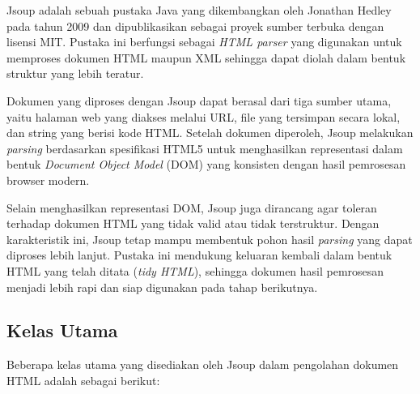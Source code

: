 

Jsoup adalah sebuah pustaka Java yang dikembangkan oleh Jonathan Hedley pada tahun 2009 dan dipublikasikan sebagai proyek sumber terbuka dengan lisensi MIT. Pustaka ini berfungsi sebagai \textit{HTML parser} yang digunakan untuk memproses dokumen HTML maupun XML sehingga dapat diolah dalam bentuk struktur yang lebih teratur.  

Dokumen yang diproses dengan Jsoup dapat berasal dari tiga sumber utama, yaitu halaman web yang diakses melalui URL, file yang tersimpan secara lokal, dan string yang berisi kode HTML. Setelah dokumen diperoleh, Jsoup melakukan \textit{parsing} berdasarkan spesifikasi HTML5 untuk menghasilkan representasi dalam bentuk \textit{Document Object Model} (DOM) yang konsisten dengan hasil pemrosesan browser modern.  

Selain menghasilkan representasi DOM, Jsoup juga dirancang agar toleran terhadap dokumen HTML yang tidak valid atau tidak terstruktur. Dengan karakteristik ini, Jsoup tetap mampu membentuk pohon hasil \textit{parsing} yang dapat diproses lebih lanjut. Pustaka ini mendukung keluaran kembali dalam bentuk HTML yang telah ditata (\textit{tidy HTML}), sehingga dokumen hasil pemrosesan menjadi lebih rapi dan siap digunakan pada tahap berikutnya.

\subsection{Kelas Utama}
\label{subsec:0227-kelas-utama}


Beberapa kelas utama yang disediakan oleh Jsoup dalam pengolahan dokumen HTML adalah sebagai berikut:

